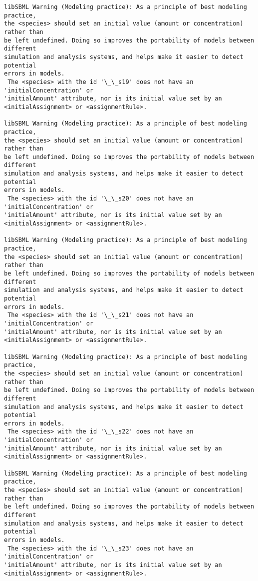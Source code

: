 \documentclass[11pt]{article}
\begin{document}
\begin{Verbatim}[commandchars=\\\{\}]
libSBML Warning (Modeling practice): As a principle of best modeling practice,
the <species> should set an initial value (amount or concentration) rather than
be left undefined. Doing so improves the portability of models between different
simulation and analysis systems, and helps make it easier to detect potential
errors in models.
 The <species> with the id '\_\_s19' does not have an 'initialConcentration' or
'initialAmount' attribute, nor is its initial value set by an
<initialAssignment> or <assignmentRule>.

libSBML Warning (Modeling practice): As a principle of best modeling practice,
the <species> should set an initial value (amount or concentration) rather than
be left undefined. Doing so improves the portability of models between different
simulation and analysis systems, and helps make it easier to detect potential
errors in models.
 The <species> with the id '\_\_s20' does not have an 'initialConcentration' or
'initialAmount' attribute, nor is its initial value set by an
<initialAssignment> or <assignmentRule>.

libSBML Warning (Modeling practice): As a principle of best modeling practice,
the <species> should set an initial value (amount or concentration) rather than
be left undefined. Doing so improves the portability of models between different
simulation and analysis systems, and helps make it easier to detect potential
errors in models.
 The <species> with the id '\_\_s21' does not have an 'initialConcentration' or
'initialAmount' attribute, nor is its initial value set by an
<initialAssignment> or <assignmentRule>.

libSBML Warning (Modeling practice): As a principle of best modeling practice,
the <species> should set an initial value (amount or concentration) rather than
be left undefined. Doing so improves the portability of models between different
simulation and analysis systems, and helps make it easier to detect potential
errors in models.
 The <species> with the id '\_\_s22' does not have an 'initialConcentration' or
'initialAmount' attribute, nor is its initial value set by an
<initialAssignment> or <assignmentRule>.

libSBML Warning (Modeling practice): As a principle of best modeling practice,
the <species> should set an initial value (amount or concentration) rather than
be left undefined. Doing so improves the portability of models between different
simulation and analysis systems, and helps make it easier to detect potential
errors in models.
 The <species> with the id '\_\_s23' does not have an 'initialConcentration' or
'initialAmount' attribute, nor is its initial value set by an
<initialAssignment> or <assignmentRule>.


\end{Verbatim}
\end{document}
